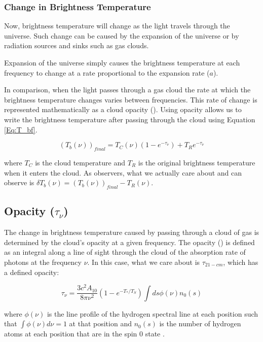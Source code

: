 \subsubsection{Change in Brightness Temperature}
Now, brightness temperature will change as the light travels through the universe. Such change can be caused by the expansion of the universe or by radiation sources and sinks such as gas clouds. 

Expansion of the universe simply causes the brightness temperature at each frequency to change at a rate proportional to the expansion rate ($a$). 

In comparison, when the light passes through a gas cloud the rate at which the brightness temperature changes varies between frequencies. This rate of change is represented mathematically as a cloud opacity (\tu). Using opacity allows us to write the brightness temperature after passing through the cloud using Equation \ref{Eq:T_bf}. 

\begin{equation}\label{Eq:T_bf}
(T_b (\nu))_{final}= T_{C} (\nu) (1-e^{-\tau_\nu}) +T_{R} e^{-\tau_\nu}
\end{equation}

where $T_{C}$ is the cloud temperature and $T_{R}$ is the original brightness temperature when it enters the cloud. As observers, what we actually care about and can observe is $\delta T_b (\nu) = (T_b (\nu))_{final} - T_R  (\nu)$. 

\subsection{Opacity ($\tau_\nu$)}
The change in brightness temperature caused by passing through a cloud of gas is determined by the cloud's opacity at a given frequency. The opacity (\tu) is defined as an integral along a line of sight through the cloud of the absorption rate of photons at the frequency $\nu$. In this case, what we care about is $\tau_{21-cm}$, which has a defined opacity:

\begin{equation} \label{Eq:tau}
\tau_{\nu} = \frac{3 c^2 A_{10}}{8 \pi \nu^2 } (1-e^{-T_*/T_S}) \int ds \phi (\nu) n_0(s)
\end{equation}

where $\phi (\nu)$ is the line profile of the hydrogen \cm spectral line at each position such that $\int \phi(\nu) d \nu = 1$ at that position and $n_0 (s)$ is the number of hydrogen atoms at each position that are in the spin 0 state \cite{furlanetto_2006}. 

